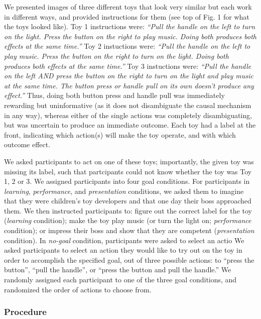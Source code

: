 \documentclass[10pt, letterpaper]{article}
\begin{document}
We presented images of three different toys that look very similar but
each work in different ways, and provided instructions for them (see top
of Fig. 1 for what the toys looked like). Toy 1 instructions were:
\emph{``Pull the handle on the left to turn on the light. Press the
button on the right to play music. Doing both produces both effects at
the same time.''} Toy 2 instuctions were: \emph{``Pull the handle on the
left to play music. Press the button on the right to turn on the light.
Doing both produces both effects at the same time.''} Toy 3 instuctions
were: \emph{``Pull the handle on the left AND press the button on the
right to turn on the light and play music at the same time. The button
press or handle pull on its own doesn't produce any effect.''} Thus,
doing both button press and handle pull was immediately rewarding but
uninformative (as it does not disambiguate the causal mechanism in any
way), whereas either of the single actions was completely
disambiguating, but was uncertain to produce an immediate outcome. Each
toy had a label at the front, indicating which action(s) will make the
toy operate, and with which outcome effect.

We asked participants to act on one of these toys; importantly, the
given toy was missing its label, such that partcipants could not know
whether the toy was Toy 1, 2 or 3. We assigned participants into four
goal conditions. For participants in \emph{learning},
\emph{performance}, and \emph{presentation} conditions, we asked them to
imagine that they were children's toy developers and that one day their
boss approached them. We then instructed participants to: figure out the
correct label for the toy (\emph{learning} condition); make the toy play
music (or turn the light on; \emph{performance} condition); or impress
their boss and show that they are competent (\emph{presentation}
condition). In \emph{no-goal} condition, participants were asked to
select an actio We asked participants to select an action they would
like to try out on the toy in order to accomplish the specified goal,
out of three possible actions: to ``press the button'', ``pull the
handle'', or ``press the button and pull the handle.'' We randomly
assigned each participant to one of the three goal conditions, and
randomized the order of actions to choose from.

\subsubsection{Procedure}\label{procedure}
\end{document}
